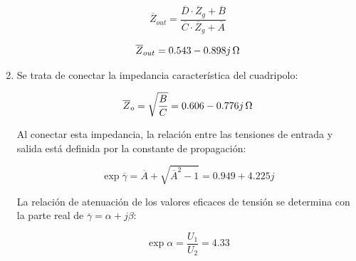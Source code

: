 \documentclass[12pt]{article}
\begin{document}
\begin{enumerate}
\[
  \overline{Z}_{out} = \frac{\overline{D} \cdot \overline{Z}_{g} +
    \overline{B}}{\overline{C} \cdot \overline{Z}_{g} + \overline{A}}
\]

  \[
    \overline{Z}_{out} = \SI[parse-numbers=false]{0.543 - 0.898j}{\ohm}
  \]
\item Se trata de conectar la impedancia característica del cuadripolo:

  \[
    \overline{Z}_o = \sqrt{\frac{B}{C}} = \SI[parse-numbers=false]{0.606-0.776j}{\ohm}
  \]

  Al conectar esta impedancia, la relación entre las tensiones de entrada y salida está definida por la constante de propagación:

  \[
    \exp{\overline{\gamma}} = \overline{A} + \sqrt{\overline{A}^2 - 1} = 0.949 + 4.225j
  \]

  La relación de atenuación de los valores eficaces de tensión se determina con la parte real de $\overline{\gamma} = \alpha + j\beta$:

  \[
    \exp{\alpha} = \frac{U_1}{U_2} = 4.33
  \]
  
\end{enumerate}
\end{document}
